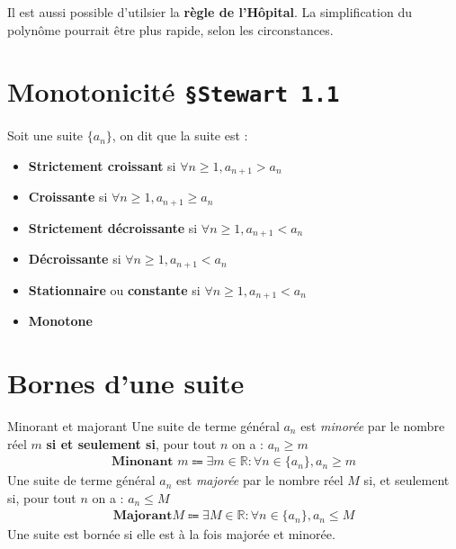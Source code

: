 \documentclass[16pt]{report}
\begin{document}
\begin{multicols*}{2}
    \begin{note}{}{}
        Il est aussi possible d'utilsier la \textbf{règle de l'Hôpital}. 
        La simplification du polynôme pourrait être plus rapide, selon 
        les circonstances. 
    \end{note}

    \section{Monotonicité \quad \texttt{\S Stewart 1.1}  }
    Soit une suite $\{a_n \}$, on dit que la suite est :
    \begin{itemize}
        \item \textbf{Strictement croissant} si $\forall n \geq 1, 
            a_{n+1} > a_n$
        \item \textbf{Croissante} si $\forall n \geq 1, 
            a_{n+1} \geq a_n$ 
        \item \textbf{Strictement décroissante} si $\forall n \geq 1, 
            a_{n+1} < a_n$ 
        \item \textbf{Décroissante} si $\forall n \geq 1, 
            a_{n+1} < a_n$ 
        \item \textbf{Stationnaire} ou \textbf{constante} si 
            $\forall n \geq 1, 
            a_{n+1} < a_n$ 
        \item \textbf{Monotone}  
    \end{itemize}

    \columnbreak
    \section{Bornes d'une suite}
    \begin{Definitionx}{Minorant et majorant}{}
      Une suite de terme général $a_n$ est \emph{minorée} par le 
      nombre réel $m$ \textbf{si et seulement si}, pour tout $n$ on a :
      $a_n \geq m$
       \begin{align*}
           \textbf{Minonant } m \Coloneqq 
           \exists m \in \mathbb{R} : \forall n \in \{ a_n \}, 
           a_n \geq m
       \end{align*}
       Une suite de terme général $a_n$ est \emph{majorée} par le nombre 
       réel $M$ si, et seulement si, pour tout $n$ on a :
       $a_n \leq M$
       \begin{align*}
           \textbf{Majorant} M \Coloneqq 
           \exists M \in \mathbb{R} : \forall n \in \{ a_n \}, 
           a_n \leq M
       \end{align*}
       Une suite est bornée si elle est à la fois majorée et minorée. 
    \end{Definitionx}


\end{multicols*}
\end{document}
